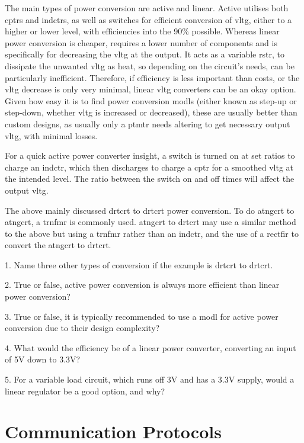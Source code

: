 \documentclass[a4paper,11pt]{report}
\newcommand{\Quiz}[1] %
{
\par\noindent %
\phantomsection %
\todo[inline, color=blue!30]{\textbf{#1}} %
\vspace{1em} %
}
\begin{document}
The main types of power conversion are active and linear. Active utilises both \gls{cptr}s and \gls{indctr}s, as well as switches for efficient conversion of \gls{vltg}, either to a higher or lower level, with efficiencies into the 90\% possible. Whereas linear power conversion is cheaper, requires a lower number of components and is specifically for decreasing the \gls{vltg} at the output. It acts as a variable \gls{rstr}, to dissipate the unwanted \gls{vltg} as heat, so depending on the circuit's needs, can be particularly inefficient. Therefore, if efficiency is less important than costs, or the \gls{vltg} decrease is only very minimal, linear \gls{vltg} converters can be an okay option. Given how easy it is to find power conversion \gls{modl}s (either known as step-up or step-down, whether \gls{vltg} is increased or decreased), these are usually better than custom designs, as usually only a \gls{ptmtr} needs altering to get necessary output \gls{vltg}, with minimal losses.

For a quick active power converter insight, a switch is turned on at set ratios to charge an \gls{indctr}, which then discharges to charge a \gls{cptr} for a smoothed \gls{vltg} at the intended level. The ratio between the switch on and off times will affect the output \gls{vltg}.

The above mainly discussed \gls{drtcrt} to \gls{drtcrt} power conversion. To do \gls{atngcrt} to \gls{atngcrt}, a \gls{trnfmr} is commonly used. \gls{atngcrt} to \gls{drtcrt} may use a similar method to the above but using a \gls{trnfmr} rather than an \gls{indctr}, and the use of a \gls{rectfir} to convert the \gls{atngcrt} to \gls{drtcrt}.

\Quiz{Quiz}

1. Name three other types of conversion if the example is \gls{drtcrt} to \gls{drtcrt}.

2. True or false, active power conversion is always more efficient than linear power conversion?

3. True or false, it is typically recommended to use a \gls{modl} for active power conversion due to their design complexity?

4. What would the efficiency be of a linear power converter, converting an input of 5V down to 3.3V?

5. For a variable load circuit, which runs off 3V and has a 3.3V supply, would a linear regulator be a good option, and why?

\pagebreak

\section{Communication Protocols}
\end{document}
